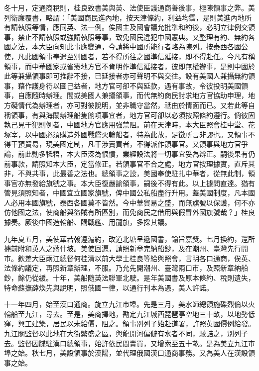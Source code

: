 \begin{pinyinscope}
冬十月，定通商稅則，桂良致書美與英、法使臣議通商善後事，極陳領事之弊。美列衛廉覆書，略謂：「美國商民進內地，按天津條約，利益均霑，是則美進內地所有請執照等情，應同英、法一例。俟國主及國會議允批準和約後，必明立律例交領事，禁止不請執照或強請執照等事，致免國民違犯中國憲典。又整理有約、無約各國之法，本大臣向知此事應變通，今請將中國所能行者略為陳列。按泰西各國公使，凡此國領事奉遣至別國者，若不得所往之國準信延接，即不得赴任。今凡有稱領事，而中華國家或省憲地方官不肯明作準信延接者，彼即無權辦事，是則中國於此等兼攝領事即可推辭不接，已延接者亦可聲明不與交往。設有美國人兼攝無約領事，藉作護身符以圖己益者，地方官可卻不與延款，遇有事故，令彼投明美國領事，自應隨時辦理。間或美國人兼攝領事，而代無約商民討求地方官協助申理，地方礙情代為辦理者，亦可對彼說明，並非職守當然，祗由於情面而已。又若此等自稱領事，有與海關辦理船隻餉項事宜者，地方官可卻以必須按照條約遵行。倘彼固執己見干犯則例者，中國地方官應用強禁阻。前在天津時，本大臣照會桂中堂、花塚宰，以中國必須購造外國戰艦火輪船者，特為此故，足徵所言非謬也。又領事不得干預貿易，現美國定制，凡干涉賣買者，不得派作領事官。又領事與地方官爭論，前此動多牴牾，本大臣深為恨憤，業經設法將一切事宜妥為辨正。嗣後果有仍前事款，請照知本大臣，定當修正。若領事官不合之處，地方官按理據實，直斥其非，不與共事，此最善之法也。總領事之設，美國奉使駐扎中華者，從無此制，領事官亦無發給旗號之事。本大臣復嚴諭領事，嗣後不得有此。以上據問直達。猶有管見須照知者，中國宜立國家旗號，俾中國公私船盡行升用。蓋美國制度，凡本國人必用本國旗號，泰西各國莫不皆然。今中華貿易之盛，而無旗號以保護，何不亦仿他國之法，使商船與盜賊有所區別，而免商民之借用與假冒外國旗號哉？」桂良據奏。厥後中國造輪船、購戰艦、用龍旗，多採其議。

九年夏五月，美使華若翰遵滬約，改道北塘呈遞國書，諭旨嘉獎。七月換約，還所擄前附和英人之蔣什坡。美使回滬，請照新章完納船鈔，及在潮州、臺灣先行開巿。欽差大臣兩江總督何桂清以前大學士桂良等給與照會，言明各口通商，俟英、法條約議定，再照新章辦理，不服。乃允先開潮州、臺灣兩口巿，及照新章納船鈔，餘仍從緩。十年，美船隨英法聯軍北駛。是年美國書及原本條約、稅則遺失，特命蘇撫薛煥先與說明，照俄國一律，以通行刊本為憑，美人許諾。

十一年四月，始至漢口通商。旋立九江巿埠。先是三月，美水師總領施碟烈倫以火輪船至九江，尋去。至是，美商擇地，勘定九江城西琵琶亭空地三十畝，以地勢低窪，興工建築，居民以未給價，阻之。領事別列子始赴道署，許照英國價例給發。九江關監督以此地在大街繁盛之區，與龍開河偏僻有水者不同，駮詰之，別列子去。監督因牒駐漢口總領事，始許依民間賣買，又增索至五十畝。是為美立九江巿埠之始。秋七月，美設領事於漢陽，並代理俄國漢口通商事務。又為美人在漢設領事之始。


\end{pinyinscope}
